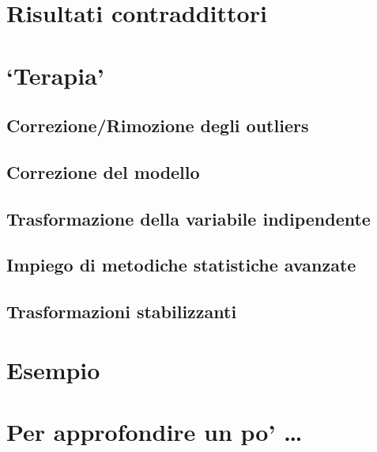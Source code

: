 \documentclass[a4paper,12pt,oneside]{book}
\begin{document}
\hypertarget{risultati-contraddittori}{%
\section{Risultati contraddittori}\label{risultati-contraddittori}}

\hypertarget{terapia}{%
\section{`Terapia'}\label{terapia}}

\hypertarget{correzionerimozione-degli-outliers}{%
\subsection{Correzione/Rimozione degli outliers}\label{correzionerimozione-degli-outliers}}

\hypertarget{correzione-del-modello}{%
\subsection{Correzione del modello}\label{correzione-del-modello}}

\hypertarget{trasformazione-della-variabile-indipendente}{%
\subsection{Trasformazione della variabile indipendente}\label{trasformazione-della-variabile-indipendente}}

\hypertarget{impiego-di-metodiche-statistiche-avanzate}{%
\subsection{Impiego di metodiche statistiche avanzate}\label{impiego-di-metodiche-statistiche-avanzate}}

\hypertarget{trasformazioni-stabilizzanti}{%
\subsection{Trasformazioni stabilizzanti}\label{trasformazioni-stabilizzanti}}

\hypertarget{esempio}{%
\section{Esempio}\label{esempio}}

\hypertarget{per-approfondire-un-po-2}{%
\section{Per approfondire un po' \ldots{}}\label{per-approfondire-un-po-2}}
\end{document}
